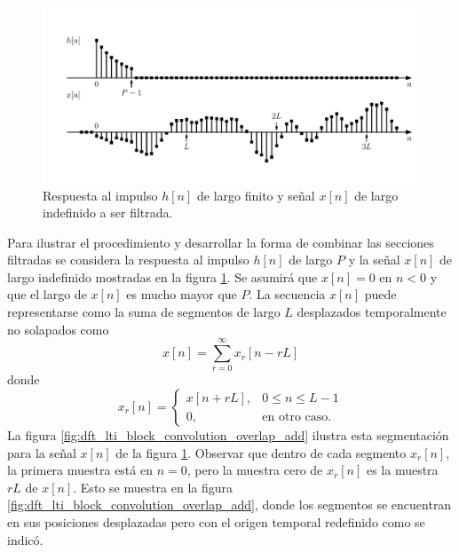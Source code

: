 \documentclass[a4paper]{report}
\begin{document}
\begin{figure}[!htb]
 \begin{center}
 \includegraphics[width=1\textwidth]{figuras/dft_lti_block_convolution_h_x.pdf}
 \caption{\label{fig:dft_lti_block_convolution_h_x} Respuesta al impulso \(h[n]\) de largo finito y señal \(x[n]\) de largo indefinido a ser filtrada.}
 \end{center}
\end{figure}
Para ilustrar el procedimiento y desarrollar la forma de combinar las secciones filtradas se considera la respuesta al impulso \(h[n]\) de largo \(P\) y la señal \(x[n]\) de largo indefinido mostradas en la figura \ref{fig:dft_lti_block_convolution_h_x}. Se asumirá que \(x[n]=0\) en \(n<0\) y que el largo de \(x[n]\) es mucho mayor que \(P\). La secuencia \(x[n]\) puede representarse como la suma de segmentos de largo \(L\) desplazados temporalmente no solapados como
\begin{equation}\label{eq:dft_lti_with_dft_signal_blocks_input}
 x[n]=\sum_{r=0}^\infty x_r[n-rL] 
\end{equation}
donde 
\[
 x_r[n]=
 \left\{ 
 \begin{array}{ll}
  x[n+rL], & 0\leq n\leq L-1\\
  0, & \textrm{en otro caso.}
 \end{array}
 \right.
\]
La figura \ref{fig:dft_lti_block_convolution_overlap_add} ilustra esta segmentación para la señal \(x[n]\) de la figura \ref{fig:dft_lti_block_convolution_h_x}. Observar que dentro de cada segmento \(x_r[n]\), la primera muestra está en \(n=0\), pero la muestra cero de \(x_r[n]\) es la muestra \(rL\) de \(x[n]\). Esto se muestra en la figura \ref{fig:dft_lti_block_convolution_overlap_add}, donde los segmentos se encuentran en sus posiciones desplazadas pero con el origen temporal redefinido como se indicó.
\end{document}
